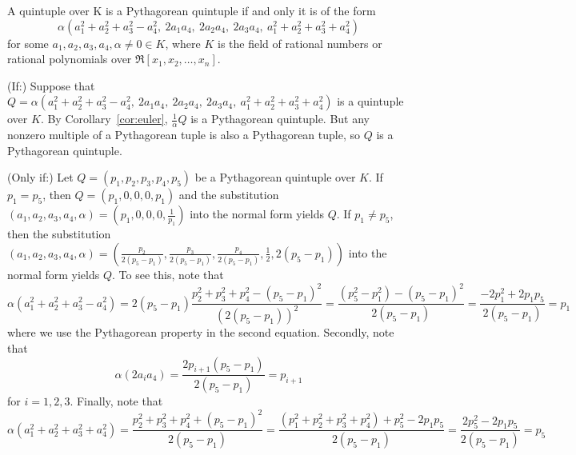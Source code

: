 \documentclass[11pt]{article}
\begin{document}
\begin{theorem}
\label{thm:quint}
A quintuple over K is a Pythagorean quintuple if and only it is of the form
\begin{equation}
\label{eq:pythquint}
	\alpha (a_1^2 + a_2^2 + a_3^2 - a_4^2,
		\ 2a_1a_4,\ 2a_2a_4,\ 2a_3a_4,
		\ a_1^2 + a_2^2 + a_3^2 + a_4^2)
\end{equation}
for some $a_1,a_2,a_3,a_4,\alpha\neq 0 \in K$, 
where $K$ is the field of rational numbers
or rational polynomials over $\Re[x_1,x_2,\ldots,x_n]$.
\end{theorem}
\prf
(If:)
Suppose that $Q = \alpha (a_1^2 + a_2^2 + a_3^2 - a_4^2,
		\ 2a_1a_4,\ 2a_2a_4,\ 2a_3a_4,
		\ a_1^2 + a_2^2 + a_3^2 + a_4^2)$ is a quintuple over $K$.
By Corollary~\ref{cor:euler}, $\frac{1}{\alpha} Q$ is a Pythagorean quintuple.
But any nonzero multiple of a Pythagorean tuple is also a Pythagorean tuple,
so $Q$ is a Pythagorean quintuple.

(Only if:) 
Let $Q = (p_1,p_2,p_3,p_4,p_5)$ be a Pythagorean quintuple over $K$.
If $p_1 = p_5$, then $Q = (p_1,0,0,0,p_1)$
and the substitution $(a_1,a_2,a_3,a_4,\alpha) = (p_1,0,0,0,\frac{1}{p_1})$ into the
normal form yields $Q$.
If $p_1 \neq p_5$, then the substitution 
$(a_1,a_2,a_3,a_4,\alpha) = 
 (\frac{p_2}{2(p_5-p_1)},
  \frac{p_3}{2(p_5-p_1)},
  \frac{p_4}{2(p_5-p_1)},
  \frac{1}{2}, 2(p_5-p_1))$ into the normal form yields $Q$.
To see this, note that
\[
  \alpha(a_1^2 + a_2^2 + a_3^2 - a_4^2)
= 2(p_5-p_1) \frac{p_2^2 + p_3^2 + p_4^2 - (p_5 - p_1)^2}{(2(p_5-p_1))^2}
= \frac{(p_5^2 - p_1^2) - (p_5 - p_1)^2}{2(p_5 - p_1)}
= \frac{-2p_1^2 + 2p_1p_5}{2(p_5 - p_1)} 
= p_1
\]
where we use the Pythagorean property in the second equation.
Secondly, note that
\[
\alpha (2a_i a_4) = \frac{2p_{i+1}(p_5 - p_1)}{2(p_5 - p_1)} = p_{i+1}
\]
for $i=1,2,3$.
Finally, note that 
\[
\alpha(a_1^2 + a_2^2 + a_3^2 + a_4^2)
= \frac{p_2^2 + p_3^2 + p_4^2 + (p_5 - p_1)^2}{2(p_5-p_1)} 
= \frac{(p_1^2 + p_2^2 + p_3^2 + p_4^2) + p_5^2 -2p_1p_5}{2(p_5-p_1)} 
= \frac{2p_5^2 - 2p_1p_5}{2(p_5-p_1)} 
= p_5
\]
\QED
\end{document}
